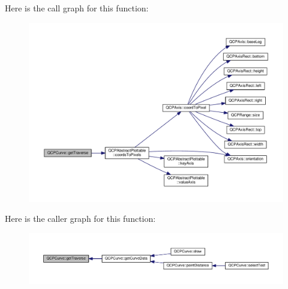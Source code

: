 Here is the call graph for this function\+:\nopagebreak
\begin{figure}[H]
\begin{center}
\leavevmode
\includegraphics[width=350pt]{class_q_c_p_curve_ab4ffdf3d62d5bd3a187f6668daf01f85_cgraph}
\end{center}
\end{figure}




Here is the caller graph for this function\+:\nopagebreak
\begin{figure}[H]
\begin{center}
\leavevmode
\includegraphics[width=350pt]{class_q_c_p_curve_ab4ffdf3d62d5bd3a187f6668daf01f85_icgraph}
\end{center}
\end{figure}


\hypertarget{class_q_c_p_curve_abe1721b19669e7127d76d144660fbeb8}{}
